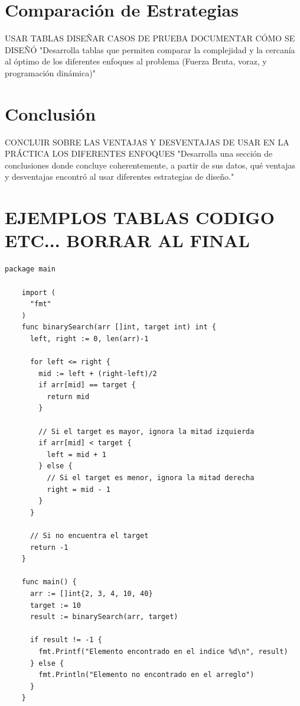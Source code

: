 \documentclass[letterpaper,10pt]{article}
\begin{document}
\section{Comparación de Estrategias}
\label{sec:comparacion_estrategias}
USAR TABLAS DISEÑAR CASOS DE PRUEBA DOCUMENTAR CÓMO SE DISEÑÓ
"Desarrolla tablas que permiten comparar la complejidad y la cercanía al óptimo de los diferentes enfoques al problema (Fuerza Bruta, voraz, y programación dinámica)"

\section{Conclusión}
\label{sec:conclusion}
CONCLUIR SOBRE LAS VENTAJAS Y DESVENTAJAS DE USAR EN LA PRÁCTICA LOS DIFERENTES ENFOQUES
"Desarrolla una sección de conclusiones donde concluye coherentemente, a partir de sus datos, qué ventajas y desventajas encontró al usar diferentes estrategias de diseño."
\section{EJEMPLOS TABLAS CODIGO ETC... BORRAR AL FINAL}
\begin{lstlisting}[caption={Algoritmo de búsqueda binaria en Go}, label={lst:binary_search}]
    package main
    
    import (
      "fmt"
    )
    func binarySearch(arr []int, target int) int {
      left, right := 0, len(arr)-1
      
      for left <= right {
        mid := left + (right-left)/2
        if arr[mid] == target {
          return mid
        }
        
        // Si el target es mayor, ignora la mitad izquierda
        if arr[mid] < target {
          left = mid + 1
        } else {
          // Si el target es menor, ignora la mitad derecha
          right = mid - 1
        }
      }
      
      // Si no encuentra el target
      return -1
    }
    
    func main() {
      arr := []int{2, 3, 4, 10, 40}
      target := 10
      result := binarySearch(arr, target)
      
      if result != -1 {
        fmt.Printf("Elemento encontrado en el indice %d\n", result)
      } else {
        fmt.Println("Elemento no encontrado en el arreglo")
      }
    }
\end{lstlisting}
\end{document}
